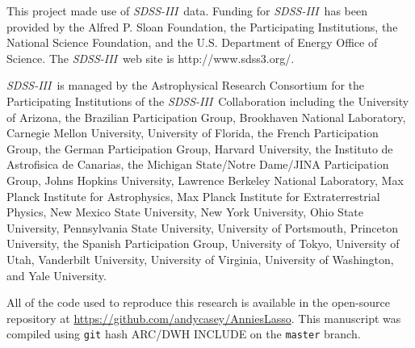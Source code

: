 \documentclass[12pt,preprint]{aastex}
\newcommand{\project}[1]{\textsl{#1}}
\newcommand{\acronym}[1]{{\small{#1}}}
\newcommand{\sdssiii}{\project{\acronym{SDSS-III}}}
\begin{document}
This project made use of \sdssiii\ data.
Funding for \sdssiii\ has been provided by the Alfred P. Sloan
Foundation, the Participating Institutions, the National Science
Foundation, and the \acronym{U.S.} Department of Energy Office of Science. The
\sdssiii\ web site is http://www.sdss3.org/.

\sdssiii\ is managed by the Astrophysical Research Consortium for the
Participating Institutions of the \sdssiii\ Collaboration including the
University of Arizona, the Brazilian Participation Group, Brookhaven
National Laboratory, Carnegie Mellon University, University of
Florida, the French Participation Group, the German Participation
Group, Harvard University, the Instituto de Astrofisica de Canarias,
the Michigan State/Notre Dame/\acronym{JINA} Participation Group, Johns Hopkins
University, Lawrence Berkeley National Laboratory, Max Planck
Institute for Astrophysics, Max Planck Institute for Extraterrestrial
Physics, New Mexico State University, New York University, Ohio State
University, Pennsylvania State University, University of Portsmouth,
Princeton University, the Spanish Participation Group, University of
Tokyo, University of Utah, Vanderbilt University, University of
Virginia, University of Washington, and Yale University.

All of the code used to reproduce this research is available in the
open-source repository at \url{https://github.com/andycasey/AnniesLasso}.
This manuscript was compiled using \texttt{git} hash ARC/DWH INCLUDE
on the \texttt{master} branch.
\end{document}
